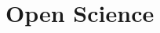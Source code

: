 \documentclass[letterpaper,twocolumn,10pt]{article}
\begin{document}

\section*{Open Science}






\end{document}
